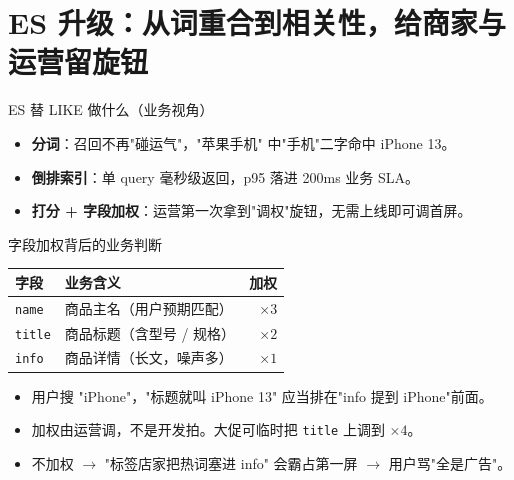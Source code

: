 \documentclass[aspectratio=169,11pt]{beamer}
\begin{document}
\section{ES 升级：从词重合到相关性，给商家与运营留旋钮}

\begin{frame}[shrink]{ES 替 LIKE 做什么（业务视角）}
\vspace{2mm}
\begin{itemize}
  \item \textbf{分词}：召回不再"碰运气"，"苹果手机" 中"手机"二字命中 iPhone 13。
  \item \textbf{倒排索引}：单 query 毫秒级返回，p95 落进 200ms 业务 SLA。
  \item \textbf{打分 + 字段加权}：运营第一次拿到"调权"旋钮，无需上线即可调首屏。
\end{itemize}
\end{frame}

\begin{frame}[shrink]{字段加权背后的业务判断}
\begin{tabular}{@{}llr@{}}
\toprule
字段          & 业务含义                       & 加权     \\
\midrule
\texttt{name}  & 商品主名（用户预期匹配）        & $\times 3$ \\
\texttt{title} & 商品标题（含型号 / 规格）       & $\times 2$ \\
\texttt{info}  & 商品详情（长文，噪声多）        & $\times 1$ \\
\bottomrule
\end{tabular}
\vspace{2mm}
\begin{itemize}
  \item 用户搜 "iPhone"，"标题就叫 iPhone 13" 应当排在"info 提到 iPhone"前面。
  \item 加权由运营调，不是开发拍。大促可临时把 \texttt{title} 上调到 $\times 4$。
  \item 不加权 $\to$ "标签店家把热词塞进 info" 会霸占第一屏 $\to$ 用户骂"全是广告"。
\end{itemize}
\end{frame}
\end{document}
